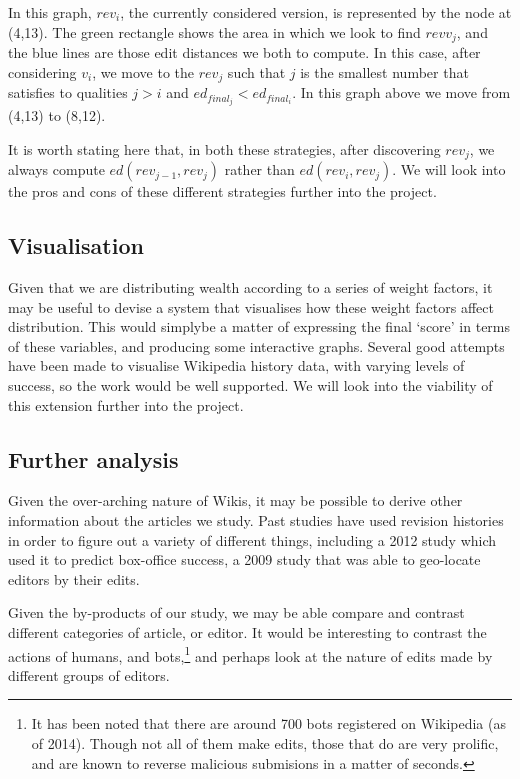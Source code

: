 In this graph, $rev_i$, the currently considered version, is
represented by the node at (4,13). The green rectangle shows
the area in which we look to find $revv_j$, and the blue lines
are those edit distances we both to compute. In this case,
after considering $v_i$, we move to the $rev_j$ such that $j$ is
the smallest number that satisfies to qualities $j > i$ and
$ed_{final_j} < ed_{final_i}$. In this graph above we move
from (4,13) to (8,12).

It is worth stating here that, in both these strategies, after
discovering $rev_j$, we always compute $ed(rev_{j-1}, rev_j)$ rather than
$ed(rev_i,rev_j)$. We will look into the pros and cons of these different
strategies further into the project.

\subsection*{Visualisation}
Given that we are distributing wealth according to a series of weight
factors, it may be useful to devise a system that visualises how these
weight factors affect distribution. This would simplybe a matter of
expressing the final `score' in terms of these variables, and
producing some interactive graphs. Several good attempts have been
made to visualise Wikipedia history data, with varying levels of
success,\cite{Chi2008}\cite{Sabel2007}\cite{Suh2007}\cite{Wu2013}\cite{Viegas2004}
so the work would be well supported. We will look into the viability
of this extension further into the project.

\subsection*{Further analysis}
Given the over-arching nature of Wikis, it may be possible to derive
other information about the articles we study. Past studies have used
revision histories in order to figure out a variety of different
things, including a 2012 study which used it to predict box-office
success,\cite{Mestyan2012} a 2009 study that was able to geo-locate
editors by their edits.\cite{Lieberman2009}

Given the by-products of our study, we may be able compare and
contrast different categories of article, or editor. It would be
interesting to contrast the actions of humans, and bots,\footnote{It
  has been noted that there are around 700 bots registered on
  Wikipedia (as of 2014). Though not all of them make edits, those
  that do are very prolific, and are known to reverse malicious
  submisions in a matter of seconds.\cite{wiki-bots}\cite{bbc-bots}}
and perhaps look at the nature of edits made by different groups of
editors.

